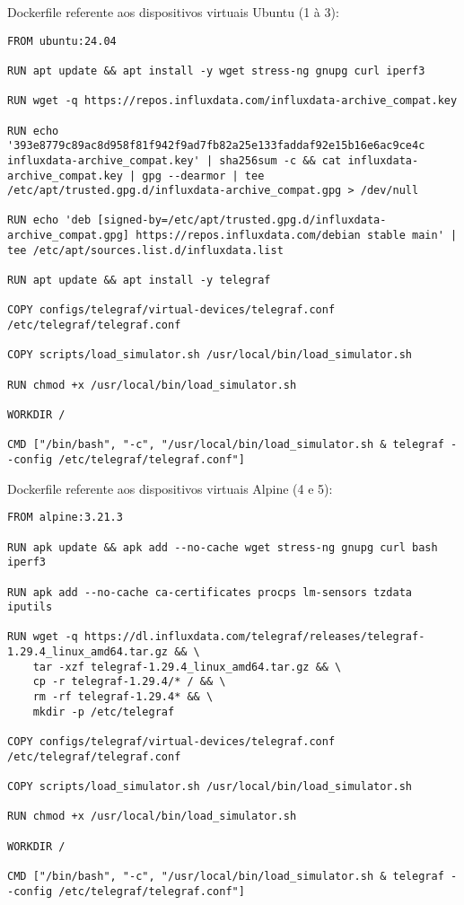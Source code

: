 Dockerfile referente aos dispositivos virtuais Ubuntu (1 à 3):
\begin{lstlisting}[breaklines=true, basicstyle=\small\ttfamily]
FROM ubuntu:24.04

RUN apt update && apt install -y wget stress-ng gnupg curl iperf3

RUN wget -q https://repos.influxdata.com/influxdata-archive_compat.key

RUN echo '393e8779c89ac8d958f81f942f9ad7fb82a25e133faddaf92e15b16e6ac9ce4c influxdata-archive_compat.key' | sha256sum -c && cat influxdata-archive_compat.key | gpg --dearmor | tee /etc/apt/trusted.gpg.d/influxdata-archive_compat.gpg > /dev/null

RUN echo 'deb [signed-by=/etc/apt/trusted.gpg.d/influxdata-archive_compat.gpg] https://repos.influxdata.com/debian stable main' | tee /etc/apt/sources.list.d/influxdata.list

RUN apt update && apt install -y telegraf

COPY configs/telegraf/virtual-devices/telegraf.conf /etc/telegraf/telegraf.conf

COPY scripts/load_simulator.sh /usr/local/bin/load_simulator.sh

RUN chmod +x /usr/local/bin/load_simulator.sh

WORKDIR /

CMD ["/bin/bash", "-c", "/usr/local/bin/load_simulator.sh & telegraf --config /etc/telegraf/telegraf.conf"]
\end{lstlisting}

Dockerfile referente aos dispositivos virtuais Alpine (4 e 5):
\begin{lstlisting}[breaklines=true, basicstyle=\small\ttfamily]
FROM alpine:3.21.3

RUN apk update && apk add --no-cache wget stress-ng gnupg curl bash iperf3

RUN apk add --no-cache ca-certificates procps lm-sensors tzdata iputils 

RUN wget -q https://dl.influxdata.com/telegraf/releases/telegraf-1.29.4_linux_amd64.tar.gz && \
    tar -xzf telegraf-1.29.4_linux_amd64.tar.gz && \
    cp -r telegraf-1.29.4/* / && \
    rm -rf telegraf-1.29.4* && \
    mkdir -p /etc/telegraf

COPY configs/telegraf/virtual-devices/telegraf.conf /etc/telegraf/telegraf.conf

COPY scripts/load_simulator.sh /usr/local/bin/load_simulator.sh

RUN chmod +x /usr/local/bin/load_simulator.sh

WORKDIR /

CMD ["/bin/bash", "-c", "/usr/local/bin/load_simulator.sh & telegraf --config /etc/telegraf/telegraf.conf"]
\end{lstlisting}